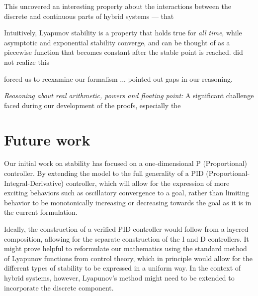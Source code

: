 \documentclass[10pt]{sigplanconf}
\begin{document}
This uncovered an interesting property about the interactions between the discrete and continuous parts of hybrid systems --- that

 Intuitively, Lyapunov stability is a property that holds true for \emph{all time}, while asymptotic and exponential stability converge, and can be thought of as a piecewise function that becomes constant after the stable point is reached. did not realize this

forced us to reexamine our formalism
... pointed out gaps in our reasoning.


\emph{Reasoning about real arithmetic, powers and floating point: }
A significant challenge faced during our development of the proofs, especially the

\section{Future work}

Our initial work on stability has focused on a one-dimensional P (Proportional) controller. By extending the model to the full generality of a PID (Proportional-Integral-Derivative) controller, which will allow for the expression of more exciting behaviors such as oscillatory convergence to a goal, rather than limiting behavior to be monotonically increasing or decreasing towards the goal as it is in the current formulation.

Ideally, the construction of a verified PID controller would follow from a layered composition, allowing for the separate construction of the I and D controllers. It might prove helpful to reformulate our mathematics using the standard method of Lyapunov functions from control theory, which in principle would allow for the different types of stability to be expressed in a uniform way. In the context of hybrid systems, however, Lyapunov's method might need to be extended to incorporate the discrete component.




\end{document}

